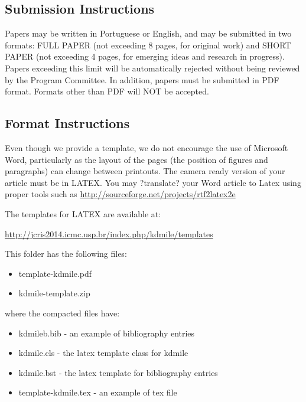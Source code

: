\documentclass[kdmile,a4paper]{kdmile} %
\begin{document}
\subsection{Submission Instructions}

Papers may be written in Portuguese or English, and may be submitted in two formats: 
FULL PAPER (not exceeding 8 pages, for original work) and  SHORT PAPER (not exceeding 4 pages, for emerging ideas and research in progress).
Papers exceeding this limit will be automatically rejected without being reviewed by the Program Committee. In addition, papers must be submitted in PDF format. Formats other than PDF will NOT be accepted. 



\subsection{Format Instructions}

Even though we provide a template, we do not encourage the use of Microsoft Word, particularly as the layout of the pages (the position of figures and paragraphs) can change between printouts. The camera ready version of your article must be in LATEX. You may ?translate? your Word article to Latex using proper tools such as \url{http://sourceforge.net/projects/rtf2latex2e}

The templates for LATEX are available at:

\begin{center}
\url{http://jcris2014.icmc.usp.br/index.php/kdmile/templates}
\end{center}

This folder has the following files:

\begin{itemize}
	\item template-kdmile.pdf
	\item kdmile-template.zip
\end{itemize}

where the compacted files have: 

\begin{itemize}
	\item kdmileb.bib - an example of bibliography entries
	\item kdmile.cls - the latex template class for kdmile
	\item kdmile.bst - the latex template for bibliography entries
	\item template-kdmile.tex - an example of tex file
\end{itemize}
\end{document}
